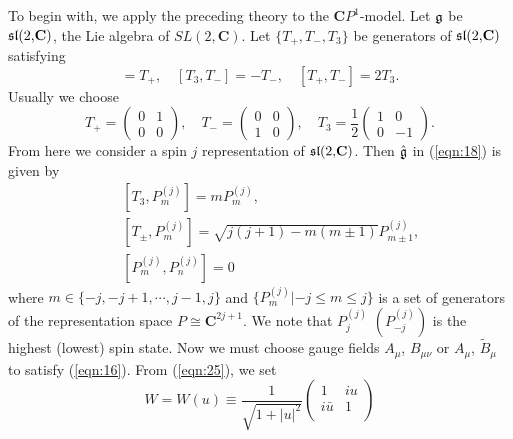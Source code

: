 \documentclass[makeidx,12pt,openany]{report}
\begin{document}
To begin with, we apply the preceding theory to the $\mathbf{C}P^1$-model. 
Let $\frak g$ be $\frak s\frak l(\mbox{2,$\mathbf{C}$})$, the Lie algebra of 
$SL(2,\mathbf{C})$. Let $\{ T_{+}, T_{-}, T_3 \} $ be generators of 
$\frak s\frak l(\mbox{2,$\mathbf{C}$})$ satisfying 
  
\begin{equation}
 [T_3,T_{+}]=T_{+}, \quad [T_3,T_{-}]=-T_{-}, \quad [T_{+},T_{-}]=2T_3.
\end{equation}
Usually we choose
\begin{equation}
 T_{+}= \left(
          \begin{array}{cc}
            0 & 1 \\
            0 & 0 
          \end{array}
        \right), \quad 
 T_{-}= \left(
          \begin{array}{cc}
            0 & 0 \\
            1 & 0 
          \end{array}
        \right), \quad 
 T_3  = \frac12
        \left(
          \begin{array}{cc}
            1 &  0 \\
            0 & -1 
          \end{array}
        \right) .
\end{equation}
From here we consider a spin $j$ representation of 
$\frak s\frak l(\mbox{2,$\mathbf{C}$})$. 
Then $\hat{\frak g}$ in (\ref{eqn:18}) is given by 
\begin{eqnarray}
 && [T_3, P_m^{(j)}] = mP_m^{(j)}, \nonumber\\
 && [T_{\pm}, P_m^{(j)}] = \sqrt{j(j+1)-m(m \pm 1)}P_{m \pm 1}^{(j)}, \\
 && [P_m^{(j)}, P_n^{(j)}] = 0 \nonumber
\end{eqnarray}
where $m \in \{ -j,-j+1, \cdots, j-1,j \} $ and 
$\{ P_m^{(j)}|-j \le m \le j \}$ is a set of generators of the representation 
space $P \cong {\mathbf{C}}^{2j+1}$. We note that 
$P_j^{(j)}$ $(P_{-j}^{(j)})$ is the highest (lowest) spin state.
Now we must choose gauge fields $A_{\mu}$, $B_{\mu \nu}$ or $A_{\mu}$, 
$\tilde{B}_{\mu}$ to satisfy (\ref{eqn:16}). From (\ref{eqn:25}), we set
\begin{equation}
 W = W(u) \equiv 
          \frac{1}{\sqrt{1+|u|^2}}
           \left(
            \begin{array}{cc}
               1     & iu \\
            i\bar{u} & 1 \\
            \end{array}
           \right)
 \label{eqn:36}
\end{equation}
\end{document}
